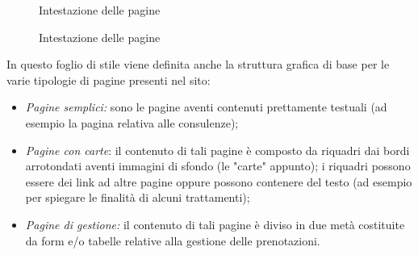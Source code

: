 \documentclass[]{article}
\begin{document}
\begin{figure}[h]
	\centering
	\caption{Intestazione delle pagine}
\end{figure}

\begin{figure}[h]
	\centering
	\caption{Intestazione delle pagine}
\end{figure}

In questo foglio di stile viene definita anche la struttura grafica di base per le varie tipologie di pagine presenti nel sito:
\begin{itemize}
	\item \textit{Pagine semplici:} sono le pagine aventi contenuti prettamente testuali (ad esempio la pagina relativa alle consulenze);
	\item \textit{Pagine con carte}: il contenuto di tali pagine è composto da riquadri dai bordi arrotondati aventi immagini di sfondo (le "carte" appunto); i riquadri possono essere dei link ad altre pagine oppure possono contenere del testo (ad esempio per spiegare le finalità di alcuni trattamenti);
	\item \textit{Pagine di gestione:} il contenuto di tali pagine è diviso in due metà costituite da form e/o tabelle relative alla gestione delle prenotazioni.
\end{itemize}

\end{document}
